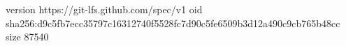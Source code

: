 version https://git-lfs.github.com/spec/v1
oid sha256:d9c5fb7ecc35797c16312740f5528fc7d90c5fe6509b3d12a490c9cb765b48cc
size 87540
